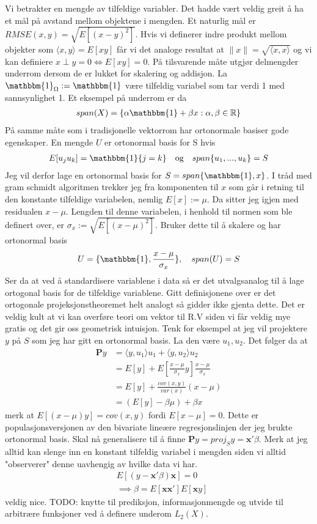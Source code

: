 Vi betrakter en mengde av tilfeldige variabler. Det hadde vært veldig greit å ha et mål på avstand mellom objektene i mengden. Et naturlig mål er $RMSE(x,y) = \sqrt{E[(x-y)^2]}$. Hvis vi definerer indre produkt mellom objekter som $\langle x,y\rangle = E[xy]$ får vi det analoge resultat at $\lVert x \rVert = \sqrt{\langle x,x \rangle}$ og vi kan definiere $x \perp y = 0 \iff E[xy]=0$. På tilsvarende måte utgjør delmengder underrom dersom de er lukket for skalering og addisjon. La $\mathbbm{1}_{\Omega} := \mathbbm{1}$ være tilfeldig variabel som tar verdi 1 med sannsynlighet 1. Et eksempel på underrom er da
\begin{align}
span(X)=\{\alpha \mathbbm{1}+\beta x : \alpha,\beta \in \mathbb{R}\}
\end{align}
På samme måte som i tradisjonelle vektorrom har ortonormale basiser gode egenskaper. En mengde $U$ er ortonormal basis for S hvis
\begin{align}
E[u_j u_k] = \mathbbm{1}\{j=k\} \quad \text{og} \quad span\{u_1,...,u_k\}=S
\end{align}
Jeg vil derfor lage en ortonormal basis for $S=span\{\mathbbm{1},x\}$. I tråd med gram schmidt algoritmen trekker jeg fra komponenten til $x$ som går i retning til den konstante tilfeldige variabelen, nemlig $E[x]:=\mu$. Da sitter jeg igjen med residualen $x-\mu$. Lengden til denne variabelen, i henhold til normen som ble definert over, er $\sigma_x:=\sqrt{E[(x-\mu)^2]}$. Bruker dette til å skalere og har ortonormal basis
\begin{align}
U=\{\mathbbm{1},\frac{x-\mu}{\sigma_x}\}, \quad span(U)=S
\end{align}
Ser da at ved å standardisere variablene i data så er det utvalgsanalog til å lage ortogonal basis for de tilfeldige variablene. Gitt definisjonene over er det ortogonale projeksjonstheoremet helt analogt så gidder ikke gjenta dette. Det er veldig kult at vi kan overføre teori om vektor til R.V siden vi får veldig mye gratis og det gir oss geometrisk intuisjon. Tenk for eksempel at jeg vil projektere $y$ på $S$ som jeg har gitt en ortonormal basis. La den være $u_1,u_2$. Det følger da at 
\begin{align}
\mathbf{P}y&=\langle y, u_1 \rangle u_1 + \langle y, u_2 \rangle u_2 \\
&=E[y]+E\left[\frac{x-\mu}{\sigma_x}y\right]\frac{x-\mu}{\sigma_x} \\
&= E[y] + \frac{cov(x,y)}{var(x)}(x-\mu) \\
&= (E[y]-\beta\mu) + \beta x
\end{align}
merk at $E[(x-\mu)y]=cov(x,y)$ fordi $E[x-\mu]=0$. Dette er populasjonsversjonen av den bivariate lineære regresjonslinjen der jeg brukte ortonormal basis. Skal nå generalisere til å finne $\mathbf{P}y=proj_S y=\mathbf{x}'\beta$. Merk at jeg alltid kan slenge inn en konstant tilfeldig variabel i mengden siden vi alltid "observerer" denne uavhengig av hvilke data vi har.
\begin{align}
&E[(y-\mathbf{x}'\beta)\mathbf{x}]=0 \\
&\implies \beta = E[\mathbf{x}\mathbf{x}']E[\mathbf{x}y]
\end{align}
veldig nice. TODO: knytte til prediksjon, informasjonmengde og utvide til arbitrære funksjoner ved å definere underom $L_2(X)$.
